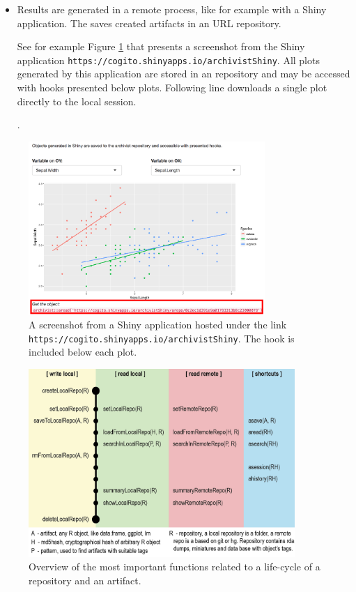 \documentclass[nojss]{jss}\usepackage[]{graphicx}\usepackage[]{color}
\begin{document}
\begin{itemize}
\item Results are generated in a remote  process, like for example with a Shiny application. The  saves created  artifacts in an URL repository. 

See for example Figure \ref{fig:shinyArchivist} that presents a screenshot from the Shiny application \linebreak\texttt{https://cogito.shinyapps.io/archivistShiny}.
All plots generated by this application are stored in an  repository and may be accessed with hooks presented below plots. Following line downloads a single plot directly to the local  session.


.
\end{itemize}

\begin{figure}[b!h]
\centering
\includegraphics[width=0.8\textwidth]{Figures/shinyArchivistApplication.png}
\caption{\label{fig:shinyArchivist}A screenshot from a Shiny application hosted under the link \texttt{https://cogito.shinyapps.io/archivistShiny}. The  hook is included below each plot.}
\end{figure}


\begin{figure}[h!]
\centering
\includegraphics[width=0.9\textwidth]{Figures/structure.png}
\caption{\label{fig:structure}Overview of the most important functions related to a life-cycle of a repository and an artifact.}
\end{figure}
\end{document}

